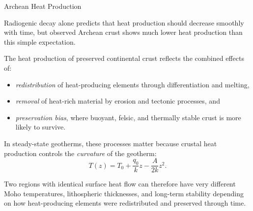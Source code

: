 \begin{activity}{Archean Heat Production}

{
Radiogenic decay alone predicts that heat production should decrease smoothly with time, but observed Archean crust shows much lower heat production than this simple expectation.

The heat production of preserved continental crust reflects the combined effects
of:
\begin{itemize}
  \item \emph{redistribution} of heat-producing elements through differentiation and melting,
  \item \emph{removal} of heat-rich material by erosion and tectonic processes, and
  \item \emph{preservation bias}, where buoyant, felsic, and thermally stable crust is more likely to survive.
\end{itemize}

In steady-state geotherms, these processes matter because crustal heat production controls the \emph{curvature} of the geotherm:
\[
T(z) = T_0 + \frac{q_0}{k}z - \frac{A}{2k}z^2.
\]

Two regions with identical surface heat flow can therefore have very different Moho temperatures, lithospheric thicknesses, and long-term stability depending on how heat-producing elements were redistributed and preserved through time.
}

\end{activity}